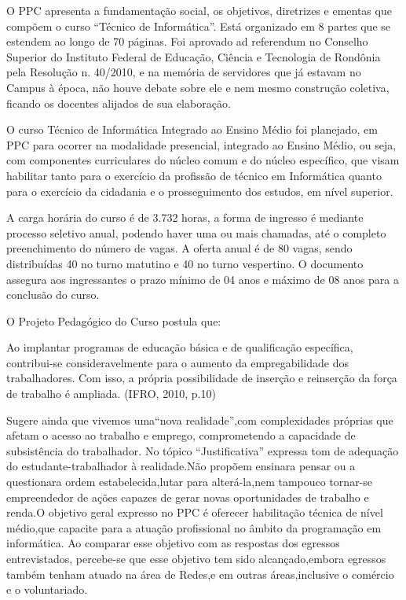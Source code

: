 \documentclass[article,12pt,onesidea,4paper,english,brazil]{abntex2}
\begin{document}
	O PPC apresenta a fundamentação social, os objetivos, diretrizes e ementas que compõem o curso “Técnico de Informática”. Está organizado em 8 partes que se estendem ao longo de 70 páginas. Foi aprovado ad referendum no Conselho Superior do Instituto Federal de Educação, Ciência e Tecnologia de Rondônia pela Resolução n. 40/2010, e na memória de servidores que já estavam no Campus à época, não houve debate sobre ele e nem mesmo construção coletiva, ficando os docentes alijados de sua elaboração.
	
	O curso Técnico de Informática Integrado ao Ensino Médio foi planejado, em PPC para ocorrer na modalidade presencial, integrado ao Ensino Médio, ou seja, com componentes curriculares do núcleo comum e do núcleo específico, que visam habilitar tanto para o exercício da profissão de técnico em Informática quanto para o exercício da cidadania e o prosseguimento dos estudos, em nível superior.
	
	A carga horária do curso é de 3.732 horas, a forma de ingresso é mediante processo seletivo anual, podendo haver uma ou mais chamadas, até o completo preenchimento do número de vagas. A oferta anual é de 80 vagas, sendo distribuídas 40 no turno matutino e 40 no turno vespertino. O documento assegura aos ingressantes o prazo mínimo de 04 anos e máximo de 08 anos para a conclusão do curso.
	
	O Projeto Pedagógico do Curso postula que:
	
	\begin{citacao}
	Ao implantar programas de educação básica e de qualificação específica, contribui-se consideravelmente para o aumento da empregabilidade dos trabalhadores. Com isso, a própria possibilidade de inserção e reinserção  da força de trabalho é ampliada. (IFRO, 2010, p.10)
	\end{citacao}

Sugere ainda que vivemos uma“nova realidade”,com complexidades próprias que afetam o acesso ao trabalho e emprego, comprometendo a capacidade de subsistência do trabalhador. No tópico “Justificativa” expressa tom de adequação do estudante-trabalhador à realidade.Não propõem ensinara pensar ou a questionara ordem estabelecida,lutar para alterá-la,nem tampouco tornar-se empreendedor de ações capazes de gerar novas oportunidades de trabalho e renda.O objetivo geral expresso no PPC é oferecer habilitação técnica de nível médio,que capacite para a atuação profissional no âmbito da programação em informática.	Ao	comparar	esse	objetivo	com	as	respostas	dos	egressos entrevistados, percebe-se que esse objetivo tem sido alcançado,embora egressos também tenham atuado na área de Redes,e em outras áreas,inclusive o comércio
e o voluntariado.
\end{document}
